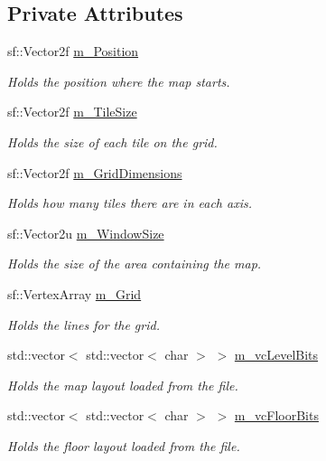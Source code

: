 \subsection*{Private Attributes}
\begin{DoxyCompactItemize}
\item 
sf\+::\+Vector2f \hyperlink{class_map_a60044ad334dbd57ed2348cba883944a5}{m\+\_\+\+Position}
\begin{DoxyCompactList}\small\item\em Holds the position where the map starts. \end{DoxyCompactList}\item 
sf\+::\+Vector2f \hyperlink{class_map_aa7bbaba3c4b92afaf00650b5f6bd1b67}{m\+\_\+\+Tile\+Size}
\begin{DoxyCompactList}\small\item\em Holds the size of each tile on the grid. \end{DoxyCompactList}\item 
sf\+::\+Vector2f \hyperlink{class_map_a8878854fc4c1963b361aaf25aa43c9f0}{m\+\_\+\+Grid\+Dimensions}
\begin{DoxyCompactList}\small\item\em Holds how many tiles there are in each axis. \end{DoxyCompactList}\item 
sf\+::\+Vector2u \hyperlink{class_map_a57cc3ace36650776ee274199955be418}{m\+\_\+\+Window\+Size}
\begin{DoxyCompactList}\small\item\em Holds the size of the area containing the map. \end{DoxyCompactList}\item 
sf\+::\+Vertex\+Array \hyperlink{class_map_ae156d7efcaaf7b84e0ef4422d407af94}{m\+\_\+\+Grid}
\begin{DoxyCompactList}\small\item\em Holds the lines for the grid. \end{DoxyCompactList}\item 
std\+::vector$<$ std\+::vector$<$ char $>$ $>$ \hyperlink{class_map_ade62d9b07c3b6ce72e1d45d8e5fd57e7}{m\+\_\+vc\+Level\+Bits}
\begin{DoxyCompactList}\small\item\em Holds the map layout loaded from the file. \end{DoxyCompactList}\item 
std\+::vector$<$ std\+::vector$<$ char $>$ $>$ \hyperlink{class_map_a75e0865954fc95295c95dd7e54b83e50}{m\+\_\+vc\+Floor\+Bits}
\begin{DoxyCompactList}\small\item\em Holds the floor layout loaded from the file. \end{DoxyCompactList}\end{DoxyCompactItemize}
